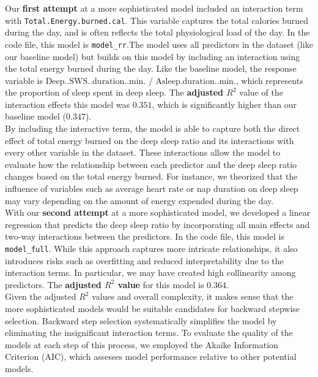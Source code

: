 \documentclass{article}
\begin{document}
Our \textbf{first attempt} at a more sophisticated model included an interaction term with \verb|Total.Energy.burned.cal|. This variable captures the total calories burned during the day, and is often reflects the total physiological load of the day. In the code file, this model is \verb|model_rr|.The model uses all predictors in the dataset (like our baseline model) but builds on this model by including an interaction using the total energy burned during the day. Like the baseline model, the response variable is \(\text{Deep..SWS..duration..min. / Asleep.duration..min.}\), which represents the proportion of sleep spent in deep sleep. 
The \textbf{adjusted \(R^2\)} value of the interaction effects this model was \(0.351\), which is significantly higher than our baseline model (\(0.347\)). \\

By including the interactive term, the model is able to capture both the direct effect of total energy burned on the deep sleep ratio and its interactions with every other variable in the dataset. These interactions allow the model to evaluate how the relationship between each predictor and the deep sleep ratio changes based on the total energy burned. For instance, we theorized that the influence of variables such as average heart rate or nap duration on deep sleep may vary depending on the amount of energy expended during the day. \\

With our \textbf{second attempt} at a more sophisticated model, we developed a linear regression that predicts the deep sleep ratio by incorporating all main effects and two-way interactions between the predictors. In the code file, this model is \verb|model_full|. While this approach captures more intricate relationships, it also introduces risks such as overfitting and reduced interpretability due to the interaction terms. In particular, we may have created high collinearity among predictors. The \textbf{adjusted $R^2$  value }for this model is \textbf{$0.364$}. \\

Given the adjusted $R^2$ values and overall complexity, it makes sense that the more sophisticated models would be suitable candidates for backward stepwise selection. Backward step selection systematically simplifies the model by eliminating the insignificant interaction terms. To evaluate the quality of the models at each step of this process, we employed the Akaike Information Criterion (AIC), which assesses model performance relative to other potential models. \\
\end{document}
